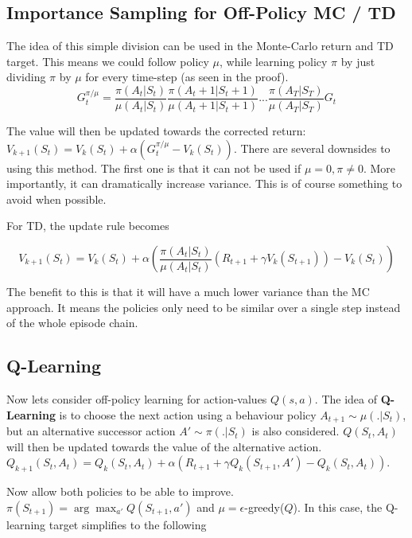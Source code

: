 \subsection{Importance Sampling for Off-Policy MC / TD}

The idea of this simple division can be used in the Monte-Carlo return and TD target. This means we could follow policy $\mu$, while learning policy $\pi$ by just dividing $\pi$ by $\mu$ for every time-step (as seen in the proof).
\begin{equation*}
	G_t^{\pi/\mu} = \frac{\pi(A_t|S_t)}{\mu(A_t|S_t)} \frac{\pi(A_t+1|S_t+1)}{\mu(A_t+1|S_t+1)} ... \frac{\pi(A_T|S_T)}{\mu(A_T|S_T)} G_t
\end{equation*} 

The value will then be updated towards the corrected return: $V_{k+1}(S_t) = V_k(S_t) + \alpha \left(G_t^{\pi/\mu} - V_k(S_t)\right)$. There are several downsides to using this method. The first one is that it can not be used if $\mu = 0, \pi \neq 0$. More importantly, it can dramatically increase variance. This is of course something to avoid when possible.

For TD, the update rule becomes

\begin{equation*}
	V_{k+1}(S_t) = V_k(S_t) + \alpha \left(\frac{\pi(A_t|S_t)}{\mu(A_t|S_t)} (R_{t+1} + \gamma V_k(S_{t+1})) - V_k(S_t)\right)
\end{equation*}

The benefit to this is that it will have a much lower variance than the MC approach. It means the policies only need to be similar over a single step instead of the whole episode chain.

\subsection{Q-Learning}

Now lets consider off-policy learning for action-values $Q(s, a)$. The idea of \textbf{Q-Learning} is to choose the next action using a behaviour policy $A_{t+1} \sim \mu(.|S_t)$, but an alternative successor action $A' \sim \pi(.|S_t)$ is also considered. $Q(S_t, A_t)$ will then be updated towards the value of the alternative action. $Q_{k+1}(S_t, A_t) = Q_k(S_t, A_t) + \alpha \left(R_{t+1} + \gamma Q_k(S_{t+1}, A') - Q_k(S_t, A_t)\right)$.

Now allow both policies to be able to improve. $\pi(S_{t+1}) = \arg\max_{a'} Q(S_{t+1}, a')$ and $\mu = \epsilon$-greedy($Q$). In this case, the Q-learning target simplifies to the following

